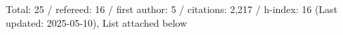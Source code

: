 Total: 25 / refereed: 16 / first author: 5 / citations: 2,217 / h-index: 16 (Last updated: 2025-05-10), List attached below
